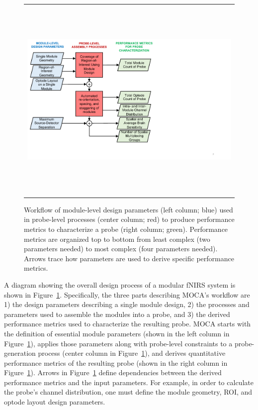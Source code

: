 \begin{figure}
    \begin{center}
    \begin{tabular}{c}
    \includegraphics[height=10cm]{fig/moca/Fig_1.pdf}
    \end{tabular}
    \end{center}
    \caption{ Workflow of module-level design parameters (left column; blue) used in probe-level processes (center column; red) to produce performance metrics to characterize a probe (right column; green). Performance metrics are organized top to bottom from least complex (two parameters needed) to most complex (four parameters needed). Arrows trace how parameters are used to derive specific performance metrics.} 
    \label{fig:flowchart}
\end{figure} 

A diagram showing the overall design process of a modular \ac{fNIRS} system is shown in Figure~\ref{fig:flowchart}. Specifically, the three parts describing \ac{MOCA}'s workflow are 1) the design parameters describing a single module design, 2) the processes and parameters used to assemble the modules into a probe, and 3) the derived performance metrics used to characterize the resulting probe. \ac{MOCA} starts with the definition of essential module parameters (shown in the left column in Figure~\ref{fig:flowchart}), applies those parameters along with probe-level constraints to a probe-generation process (center column in Figure~\ref{fig:flowchart}), and derives quantitative performance metrics of the resulting probe (shown in the right column in Figure~\ref{fig:flowchart}). Arrows in Figure~\ref{fig:flowchart} define dependencies between the derived performance metrics and the input parameters. For example, in order to calculate the probe's channel distribution, one must define the module geometry, \ac{ROI}, and optode layout design parameters. 

